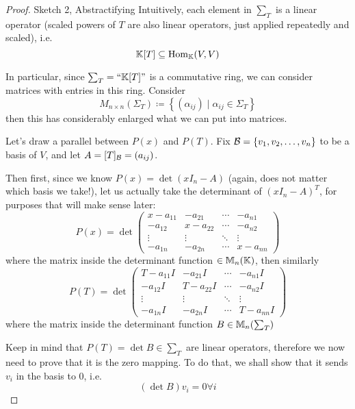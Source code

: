\begin{proof} {Sketch 2, Abstractifying}
    Intuitively, each element in \(\sum_T\) is a linear operator (scaled powers of \(T\) are also linear operators, just applied repeatedly and scaled), i.e. \[
        \mathbb{K}[T] \subseteq \mathrm{Hom}_{\mathbb{K}}(V, V)
    \]

    In particular, since \(\sum_T = ``\mathbb{K}[T]"\) is a commutative ring, we can consider matrices with entries in this ring. Consider \[
        M_{n \times n}\left(\Sigma_T\right) \coloneqq \left\{ (\alpha_{ij}) \mid \alpha_{ij} \in \Sigma_T\right\}
    \]
    then this has considerably enlarged what we can put into matrices.

    Let's draw a parallel between \(P(x)\) and \(P(T)\). Fix \(\mathcal{B} = \{v_1, v_2, \dots, v_n\}\) to be a basis of \(V\), and let \(A = [T]_{\mathcal{B}} = (a_{ij})\).

    Then first, since we know \(P(x) = \det(xI_n - A)\) (again, does not matter which basis we take!), let us actually take the determinant of \((xI_n - A)^T\), for purposes that will make sense later:
    \[
        P(x) = \det \begin{pmatrix}
            x - a_{11} & -a_{21}    & \cdots & -a_{n1}  \\
            -a_{12}    & x - a_{22} & \cdots & -a_{n2}  \\
            \vdots     & \vdots     & \ddots & \vdots   \\
            -a_{1n}    & -a_{2n}    & \cdots & x-a_{nn}
        \end{pmatrix}
    \]
    where the matrix inside the determinant function \(\in \mathbb{M}_n(\mathbb{K})\), then similarly \[
        P(T) = \det \begin{pmatrix}
            T - a_{11}I & -a_{21}I    & \cdots & -a_{n1}I  \\
            -a_{12}I    & T - a_{22}I & \cdots & -a_{n2}I  \\
            \vdots      & \vdots      & \ddots & \vdots    \\
            -a_{1n}I    & -a_{2n}I    & \cdots & T-a_{nn}I
        \end{pmatrix}
    \]
    where the matrix inside the determinant function \( B \in \mathbb{M}_n(\sum_T)\)

    Keep in mind that \(P(T) = \det B \in \sum_T\) are linear operators, therefore we now need to prove that it is the zero mapping. To do that, we shall show that it sends \(v_i\) in the basis to 0, i.e. \[
        (\det B) v_i = 0 \forall i
    \]


\end{proof}
